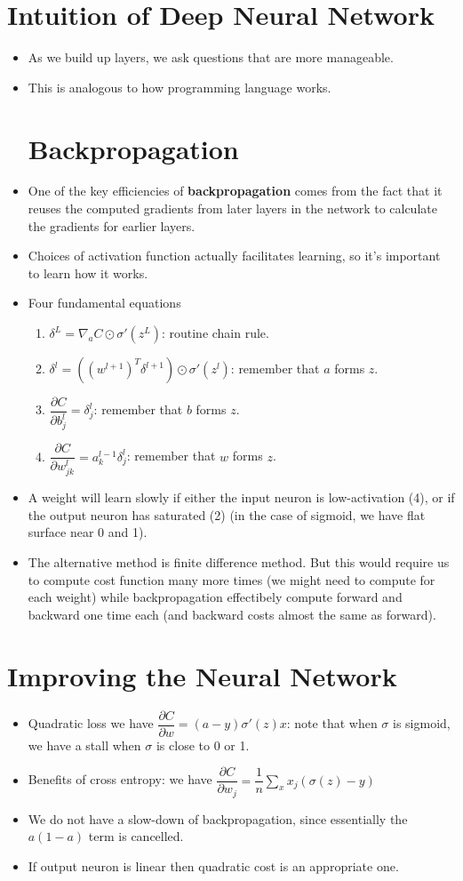 \documentclass[11pt,reqno]{amsart}
\theoremstyle{remark}
\begin{document}
\begin{sloppypar}
\section*{Intuition of Deep Neural Network}
\begin{itemize}
\item As we build up layers, we ask questions that are more manageable.
\item This is analogous to how programming language works.
\section*{Backpropagation}
\item One of the key efficiencies of \textbf{backpropagation} comes 
from the fact that it reuses the computed gradients from later 
layers in the network to calculate the gradients for earlier layers.
\item Choices of activation function actually facilitates learning, so it's important to learn how it works.
\item Four fundamental equations
\begin{enumerate}
\item $\delta^L=\nabla_a C\odot \sigma'(z^L)$: routine chain rule.
\item $\delta^l=((w^{l+1})^T\delta^{l+1})\odot\sigma'(z^l)$: remember that $a$ forms $z$.
\item $\dfrac{\partial C}{\partial b^l_j}=\delta^l_j$: remember that $b$ forms $z$.
\item $\dfrac{\partial C}{\partial w^l_{jk}}=a_k^{l-1}\delta^l_j$: remember that $w$ forms $z$.
\end{enumerate}
\item A weight will learn slowly if either the input neuron is low-activation (4), or
 if the output neuron has saturated (2) (in the case of sigmoid, we have flat surface near 0 and 1).
\item The alternative method is finite difference method. But this would require us to 
compute cost function many more times (we might need to compute for each weight)
while backpropagation effectibely compute forward and backward one time each (and backward costs almost the same as forward).
\end{itemize}
\section*{Improving the Neural Network}
\begin{itemize}
\item Quadratic loss we have $\dfrac{\partial C}{\partial w}=(a-y)\sigma'(z)x$: note 
that when $\sigma$ is sigmoid, we have a stall when $\sigma$ is close to 0 or 1.
\item Benefits of cross entropy: we have $\dfrac{\partial C}{\partial w_j}=\dfrac 1n\sum_x x_j(\sigma(z)-y)$
\item We do not have a slow-down of backpropagation, since essentially the $a(1-a)$ term is cancelled. 
\item If output neuron is linear then quadratic cost is an appropriate one.
\end{itemize}
\end{sloppypar}
\end{document}
